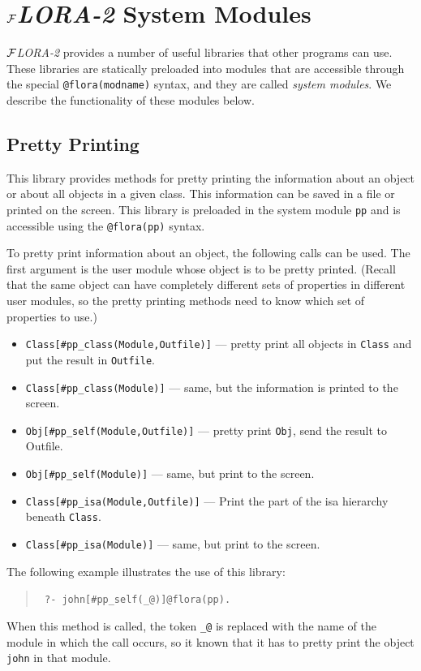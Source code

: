 \documentclass[11pt]{article}
\makeatletter
\newcommand{\thismodule}{{\tt \_@}\xspace}
\newcommand{\FLORA}{{\mbox{${\cal F}${\small\it LORA}\rm\emph{-2}}}\xspace}
\makeatother
\begin{document}
\section{\FLORA System Modules}\label{sec-service-libs}

\FLORA provides a number of useful libraries that other programs can use.
These libraries are statically preloaded into modules that are accessible
through the special {\tt @flora(modname)} syntax, and they are called
\emph{system modules}.  We describe the functionality of these modules
below.

\subsection{Pretty Printing}

This library provides methods for pretty printing the information about an
object or about all objects in a given class. This information can be saved
in a file or printed on the screen. This library is preloaded in the
system module {\tt pp} and is accessible using the {\tt @flora(pp)}
syntax.

To pretty print information about an object, the following calls can be
used.  The first argument is the user module whose object is to be pretty
printed. (Recall that the same object can have completely different sets of
properties in different user modules, so the pretty printing methods need to
know which set of properties to use.)
\begin{itemize}
  \item  {\tt Class[\#pp\_class(Module,Outfile)]} --- pretty print all
  objects in {\tt Class} and put the result in {\tt Outfile}.
\item {\tt Class[\#pp\_class(Module)]} --- same, but the information is
  printed to the screen.
\item {\tt Obj[\#pp\_self(Module,Outfile)]} --- pretty print {\tt Obj}, send
  the result to Outfile.
\item {\tt Obj[\#pp\_self(Module)]} --- same, but print to the screen.
\item {\tt Class[\#pp\_isa(Module,Outfile)]} --- Print the part of the isa
  hierarchy beneath {\tt Class}.
\item {\tt Class[\#pp\_isa(Module)]} --- same, but print to the screen.
\end{itemize}
The following example illustrates the use of this library:
\begin{quote}
 {\tt
   ?- john[\#pp\_self(\thismodule)]@flora(pp).
   }
\end{quote}
When this method is called, the token \thismodule is replaced with the name
of the module in which the call occurs, so it known that it has to pretty
print the object {\tt john} in that module.
\end{document}
